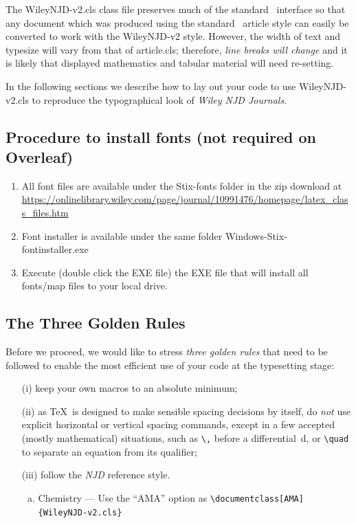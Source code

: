 \documentclass[AMA,STIX1COL]{WileyNJD-v2}
\begin{document}
The \textsf{WileyNJD-v2.cls} class file preserves much of the standard
\LaTeXe\ interface so that any document which was produced using
the standard \LaTeXe\ \textsf{article} style can easily be
converted to work with the \textsf{WileyNJD-v2} style. However, the
width of text and typesize will vary from that of
\textsf{article.cls}; therefore, \emph{line breaks will change}
and it is likely that displayed mathematics and tabular material
will need re-setting.

In the following sections we describe how to lay out your code to
use \textsf{WileyNJD-v2.cls} to reproduce the typographical look of
\emph{Wiley NJD Journals}.

\subsection{Procedure to install fonts (not required on Overleaf)}
 
\begin{enumerate}
\item All font files are available under the Stix-fonts folder in the zip download at \url{https://onlinelibrary.wiley.com/page/journal/10991476/homepage/latex_class_files.htm}
\item Font installer is available under the same folder Windows-Stix-fontinstaller.exe
\item Execute (double click the EXE file) the EXE file that will install all fonts/map files to your local drive.
\end{enumerate}

\subsection{The Three Golden Rules} 

Before we proceed, we would like to
stress \emph{three golden rules} that need to be followed to
enable the most efficient use of your code at the typesetting
stage:
\begin{enumerate}
\item[(i)] keep your own macros to an absolute minimum;

\item[(ii)] as \TeX\ is designed to make sensible spacing
decisions by itself, do \emph{not} use explicit horizontal or
vertical spacing commands, except in a few accepted (mostly
mathematical) situations, such as \verb"\," before a
differential~d, or \verb"\quad" to separate an equation from its
qualifier;

\item[(iii)] follow the \emph{NJD} reference style.
\begin{enumerate}[a.]
\item Chemistry --- Use the ``AMA'' option as \verb"\documentclass[AMA]{WileyNJD-v2.cls}"

\end{enumerate}
\end{enumerate}
\end{document}

